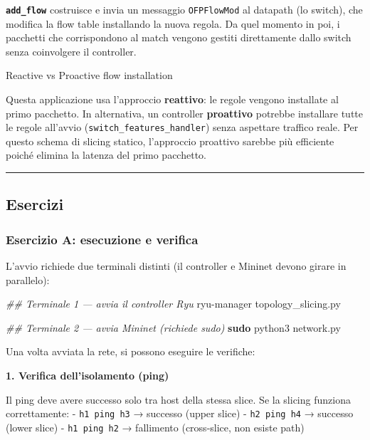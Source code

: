 \documentclass[
  italian,
  openany]{book}
\newenvironment{Shaded}{\begin{snugshade}}{\end{snugshade}}
\newcommand{\CommentTok}[1]{\textcolor[rgb]{0.56,0.35,0.01}{\textit{#1}}}
\newcommand{\ExtensionTok}[1]{#1}
\newcommand{\FunctionTok}[1]{\textcolor[rgb]{0.13,0.29,0.53}{\textbf{#1}}}
\newcommand{\NormalTok}[1]{#1}
\begin{document}
\textbf{\texttt{add\_flow}} costruisce e invia un messaggio
\texttt{OFPFlowMod} al datapath (lo switch), che modifica la flow table
installando la nuova regola. Da quel momento in poi, i pacchetti che
corrispondono al match vengono gestiti direttamente dallo switch senza
coinvolgere il controller.

\begin{calloutnote}{Reactive vs Proactive flow installation}

Questa applicazione usa l'approccio \textbf{reattivo}: le regole vengono
installate al primo pacchetto. In alternativa, un controller
\textbf{proattivo} potrebbe installare tutte le regole all'avvio
(\texttt{switch\_features\_handler}) senza aspettare traffico reale. Per
questo schema di slicing statico, l'approccio proattivo sarebbe più
efficiente poiché elimina la latenza del primo pacchetto.

\end{calloutnote}

\begin{center}\rule{0.5\linewidth}{0.5pt}\end{center}

\subsection{Esercizi}\label{esercizi}

\subsubsection{Esercizio A: esecuzione e
verifica}\label{esercizio-a-esecuzione-e-verifica}

L'avvio richiede due terminali distinti (il controller e Mininet devono
girare in parallelo):

\begin{Shaded}
\begin{Highlighting}[]
\CommentTok{\#\# Terminale 1 — avvia il controller Ryu}
\ExtensionTok{ryu{-}manager}\NormalTok{ topology\_slicing.py}

\CommentTok{\#\# Terminale 2 — avvia Mininet (richiede sudo)}
\FunctionTok{sudo}\NormalTok{ python3 network.py}
\end{Highlighting}
\end{Shaded}

Una volta avviata la rete, si possono eseguire le verifiche:

\textbf{1. Verifica dell'isolamento (ping)}

Il ping deve avere successo solo tra host della stessa slice. Se la
slicing funziona correttamente: - \texttt{h1\ ping\ h3} → successo
(upper slice) - \texttt{h2\ ping\ h4} → successo (lower slice) -
\texttt{h1\ ping\ h2} → fallimento (cross-slice, non esiste path)
\end{document}
